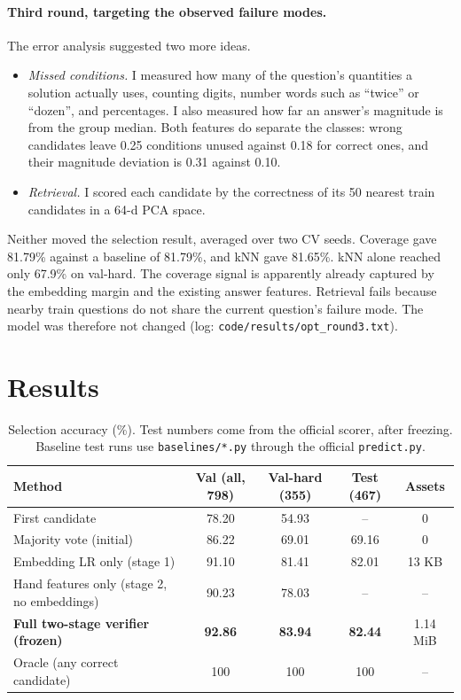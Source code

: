 \documentclass[10pt,a4paper]{article}
\begin{document}
\paragraph{Third round, targeting the observed failure modes.} The error analysis suggested two more ideas.
\begin{itemize}
\item \emph{Missed conditions.} I measured how many of the question's quantities a solution actually uses, counting digits, number words such as ``twice'' or ``dozen'', and percentages. I also measured how far an answer's magnitude is from the group median. Both features do separate the classes: wrong candidates leave 0.25 conditions unused against 0.18 for correct ones, and their magnitude deviation is 0.31 against 0.10.
\item \emph{Retrieval.} I scored each candidate by the correctness of its 50 nearest train candidates in a 64-d PCA space.
\end{itemize}
Neither moved the selection result, averaged over two CV seeds. Coverage gave 81.79\% against a baseline of 81.79\%, and kNN gave 81.65\%. kNN alone reached only 67.9\% on val-hard. The coverage signal is apparently already captured by the embedding margin and the existing answer features. Retrieval fails because nearby train questions do not share the current question's failure mode. The model was therefore not changed (log: \texttt{code/results/opt\_round3.txt}).

\section{Results}
\begin{table}[h]\centering\small
\begin{tabular}{lcccc}\toprule
Method & Val (all, 798) & Val-hard (355) & \textbf{Test (467)} & Assets \\ \midrule
First candidate & 78.20 & 54.93 & -- & 0 \\
Majority vote (initial) & 86.22 & 69.01 & 69.16 & 0 \\
Embedding LR only (stage 1) & 91.10 & 81.41 & 82.01 & 13 KB \\
Hand features only (stage 2, no embeddings) & 90.23 & 78.03 & -- & -- \\
\textbf{Full two-stage verifier (frozen)} & \textbf{92.86} & \textbf{83.94} & \textbf{82.44} & 1.14 MiB \\
Oracle (any correct candidate) & 100 & 100 & 100 & -- \\ \bottomrule
\end{tabular}
\caption{Selection accuracy (\%). Test numbers come from the official scorer, after freezing. Baseline test runs use \texttt{baselines/*.py} through the official \texttt{predict.py}.}
\end{table}
\end{document}

